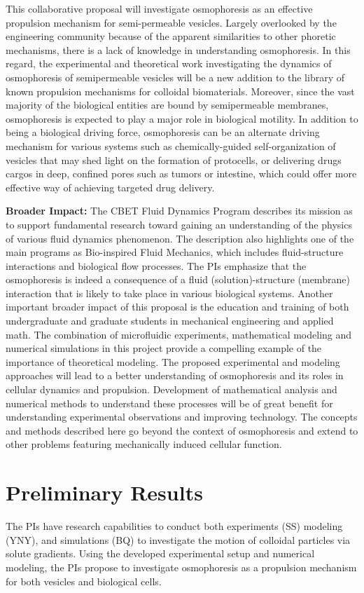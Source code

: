 \documentclass[11pt]{article}
\begin{document}
This collaborative proposal will investigate osmophoresis as an
effective propulsion mechanism for semi-permeable vesicles.  Largely
overlooked by the engineering community because of the apparent
similarities to other phoretic mechanisms, there is a lack of knowledge
in understanding osmophoresis.  In this regard, the experimental and
theoretical work investigating the dynamics of osmophoresis of
semipermeable vesicles will be a new addition to the library of known
propulsion mechanisms for colloidal biomaterials.  Moreover, since the
vast majority of the biological entities are bound by semipermeable
membranes, osmophoresis is expected to play a major role in biological
motility.  In addition to being a biological driving force, osmophoresis
can be an alternate driving mechanism for various systems such as
chemically-guided self-organization of vesicles that may shed light on
the formation of protocells, or delivering drugs cargos in deep,
confined pores such as tumors or intestine, which could offer more
effective way of achieving targeted drug delivery.

\noindent
{\bf Broader Impact:} 
The CBET Fluid Dynamics Program describes its mission as to support
fundamental research toward gaining an understanding of the physics of
various fluid dynamics phenomenon. The description also highlights one
of the main programs as Bio-inspired Fluid Mechanics, which includes
fluid-structure interactions and biological flow processes. The PIs
emphasize that the osmophoresis is indeed a consequence of a fluid
(solution)-structure (membrane) interaction that is likely to take place
in various biological systems.  Another important broader impact of this
proposal is the education and training of both undergraduate and
graduate students in mechanical engineering and applied math.  The
combination of microfluidic experiments, mathematical modeling and
numerical simulations in this project provide a compelling example of
the importance of theoretical modeling. The proposed experimental and
modeling approaches will lead to a better understanding of osmophoresis
and its roles in cellular dynamics and propulsion.  Development of
mathematical analysis and numerical methods to understand these
processes will be of great benefit for understanding experimental
observations and improving technology.  The concepts and methods
described here go beyond the context of osmophoresis and extend to other
problems featuring mechanically induced cellular function.

\section{Preliminary Results\label{sec:preliminary_results}} The PIs
have research capabilities to conduct both experiments (SS) modeling
(YNY), and simulations (BQ) to investigate the motion of colloidal
particles via solute gradients.  Using the developed experimental setup
and numerical modeling, the PIs propose to investigate osmophoresis as a
propulsion mechanism for both vesicles and biological cells. 
\end{document}
